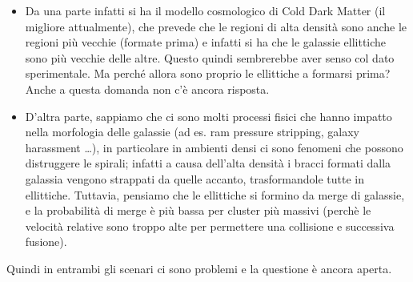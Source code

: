 \begin{itemize}
	\item Da una parte infatti si ha il modello cosmologico di Cold Dark Matter (il migliore attualmente), che prevede che le regioni di alta densità sono anche le regioni più vecchie (formate prima) e infatti si ha che le galassie ellittiche sono più vecchie delle altre. Questo quindi sembrerebbe aver senso col dato sperimentale. Ma perché allora sono proprio le ellittiche a formarsi prima? Anche a questa domanda non c’è ancora risposta.
	\item D’altra parte, sappiamo che ci sono molti processi fisici che hanno impatto nella morfologia delle galassie (ad es. ram pressure stripping, galaxy harassment \dots), in particolare in ambienti densi ci sono fenomeni che possono distruggere le spirali; infatti a causa dell'alta densità i bracci formati dalla galassia vengono strappati da quelle accanto, trasformandole tutte in ellittiche. Tuttavia, pensiamo che le ellittiche si formino da merge di galassie, e la probabilità di merge è più bassa per cluster più massivi (perchè le velocità relative sono troppo alte per permettere una collisione e successiva fusione).
\end{itemize}

Quindi in entrambi gli scenari ci sono problemi e la questione è ancora aperta.
